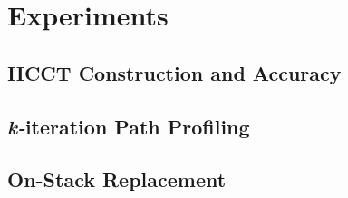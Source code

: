 \chapter{Experiments}
\label{ch:experiments}

\section{HCCT Construction and Accuracy}

\section{{\em k-}iteration Path Profiling}

\section{On-Stack Replacement}